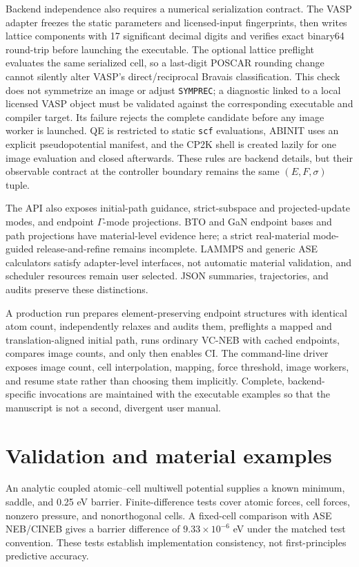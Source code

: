 \documentclass[final,5p,times,twocolumn]{elsarticle}
\begin{document}
Backend independence also requires a numerical serialization contract. The
VASP adapter freezes the static parameters and licensed-input fingerprints,
then writes lattice components with 17 significant decimal digits and verifies
exact binary64 round-trip before launching the executable.  The optional
lattice preflight evaluates the same serialized cell, so a last-digit POSCAR
rounding change cannot silently alter VASP's direct/reciprocal Bravais
classification.  This check does not symmetrize an image or adjust
\texttt{SYMPREC}; a diagnostic linked to a local licensed VASP object must be
validated against the corresponding executable and compiler target.  Its
failure rejects the complete candidate before any image worker is launched.
QE is restricted to static \texttt{scf} evaluations, ABINIT uses an explicit
pseudopotential manifest, and the CP2K shell is created lazily for one image
evaluation and closed afterwards. These rules are backend details, but their
observable contract at the controller boundary remains the same $(E,F,\sigma)$
tuple.

The API also exposes initial-path guidance, strict-subspace and
projected-update modes, and endpoint $\Gamma$-mode projections. BTO and GaN
endpoint bases and path projections have material-level evidence here; a
strict real-material mode-guided release-and-refine remains incomplete. LAMMPS
and generic ASE calculators satisfy adapter-level interfaces, not automatic
material validation, and scheduler resources remain user selected. JSON
summaries, trajectories, and audits preserve these distinctions.

A production run prepares element-preserving endpoint structures with identical
atom count, independently relaxes and audits them, preflights a mapped and
translation-aligned initial path, runs ordinary VC-NEB with cached endpoints,
compares image counts, and only then enables CI. The command-line driver
exposes image count, cell interpolation, mapping, force threshold, image
workers, and resume state rather than choosing them implicitly. Complete,
backend-specific invocations are maintained with the executable examples so
that the manuscript is not a second, divergent user manual.

\section{Validation and material examples}
\label{sec:results}

An analytic coupled atomic--cell multiwell potential supplies a known minimum,
saddle, and 0.25 eV barrier. Finite-difference tests cover atomic forces, cell
forces, nonzero pressure, and nonorthogonal cells. A fixed-cell comparison with
ASE NEB/CINEB gives a barrier difference of $9.33\times10^{-6}$ eV under the
matched test convention. These tests establish implementation consistency, not
first-principles predictive accuracy.
\end{document}
